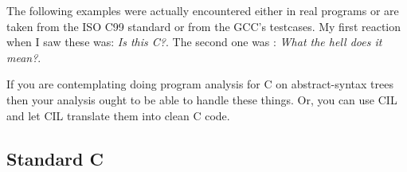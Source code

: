 \documentclass{article}
\begin{document}
 The following examples were actually encountered either in real programs or
are taken from the ISO C99 standard or from the GCC's testcases. My first
reaction when I saw these was: {\em Is this C?}. The second one was : {\em
What the hell does it mean?}. 

 If you are contemplating doing program analysis for C on abstract-syntax
trees then your analysis ought to be able to handle these things. Or, you can
use CIL and let CIL translate them into clean C code. 

%
%
%
 \subsection{Standard C}
\end{document}
